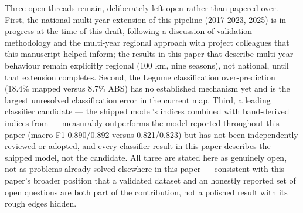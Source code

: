 Three open threads remain, deliberately left open rather than papered over. First, the national multi-year extension of this pipeline (2017-2023, 2025) is in progress at the time of this draft, following a discussion of validation methodology and the multi-year regional approach with project colleagues that this manuscript helped inform; the results in this paper that describe multi-year behaviour remain explicitly regional (100 km, nine seasons), not national, until that extension completes. Second, the Legume classification over-prediction (18.4\% mapped versus 8.7\% ABS) has no established mechanism yet and is the largest unresolved classification error in the current map. Third, a leading classifier candidate --- the shipped model's indices combined with band-derived indices from \citet{sharma2026wa} --- measurably outperforms the model reported throughout this paper (macro F1 0.890/0.892 versus 0.821/0.823) but has not been independently reviewed or adopted, and every classifier result in this paper describes the shipped model, not the candidate. All three are stated here as genuinely open, not as problems already solved elsewhere in this paper --- consistent with this paper's broader position that a validated dataset and an honestly reported set of open questions are both part of the contribution, not a polished result with its rough edges hidden.
